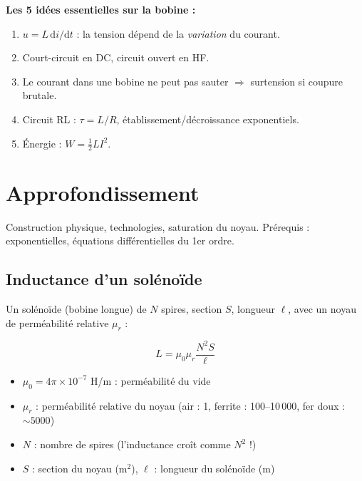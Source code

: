 \documentclass[12pt,a4paper,twoside]{book}
\begin{document}
\begin{retenir}
\textbf{Les 5 idées essentielles sur la bobine :}
\begin{enumerate}[nosep]
\item $u = L\,\mathrm{d}i/\mathrm{d}t$ : la tension dépend de la \textit{variation} du courant.
\item Court-circuit en DC, circuit ouvert en HF.
\item Le courant dans une bobine ne peut pas sauter $\Rightarrow$ surtension si coupure brutale.
\item Circuit RL : $\tau = L/R$, établissement/décroissance exponentiels.
\item Énergie : $W = \frac{1}{2}LI^2$.
\end{enumerate}
\end{retenir}

\section{Approfondissement}

\begin{approfondissement}
Construction physique, technologies, saturation du noyau. Prérequis : exponentielles, équations différentielles du 1er ordre.
\end{approfondissement}

\subsection{Inductance d'un solénoïde}

Un solénoïde (bobine longue) de $N$ spires, section $S$, longueur $\ell$, avec un noyau de perméabilité relative $\mu_r$ :

\begin{formule}
\[
\boxed{L = \mu_0 \mu_r \frac{N^2 S}{\ell}}
\]
\begin{itemize}[nosep]
\item $\mu_0 = 4\pi\times10^{-7}$ H/m : perméabilité du vide
\item $\mu_r$ : perméabilité relative du noyau (air : 1, ferrite : 100--10\,000, fer doux : $\sim 5000$)
\item $N$ : nombre de spires (l'inductance croît comme $N^2$ !)
\item $S$ : section du noyau (m$^2$), $\ell$ : longueur du solénoïde (m)
\end{itemize}
\end{formule}
\end{document}
